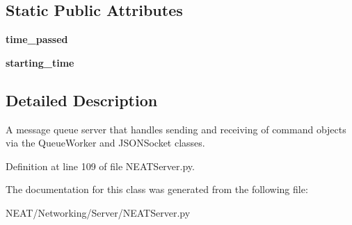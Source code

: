 \subsection*{Static Public Attributes}
\begin{DoxyCompactItemize}
\item 
{\bfseries time\+\_\+passed}\hypertarget{class_n_e_a_t___py_genetics_1_1_n_e_a_t_1_1_networking_1_1_server_1_1_n_e_a_t_server_1_1_n_e_a_t_server_acbbd8416ba0d7139131ff0e553b20c3d}{}\label{class_n_e_a_t___py_genetics_1_1_n_e_a_t_1_1_networking_1_1_server_1_1_n_e_a_t_server_1_1_n_e_a_t_server_acbbd8416ba0d7139131ff0e553b20c3d}

\item 
{\bfseries starting\+\_\+time}\hypertarget{class_n_e_a_t___py_genetics_1_1_n_e_a_t_1_1_networking_1_1_server_1_1_n_e_a_t_server_1_1_n_e_a_t_server_abba58b32d9919608f5502e001dbd62dd}{}\label{class_n_e_a_t___py_genetics_1_1_n_e_a_t_1_1_networking_1_1_server_1_1_n_e_a_t_server_1_1_n_e_a_t_server_abba58b32d9919608f5502e001dbd62dd}

\end{DoxyCompactItemize}


\subsection{Detailed Description}
\begin{DoxyVerb}A message queue server that handles sending and receiving
of command objects via the QueueWorker and JSONSocket classes.
\end{DoxyVerb}
 

Definition at line 109 of file N\+E\+A\+T\+Server.\+py.



The documentation for this class was generated from the following file\+:\begin{DoxyCompactItemize}
\item 
N\+E\+A\+T/\+Networking/\+Server/N\+E\+A\+T\+Server.\+py\end{DoxyCompactItemize}
